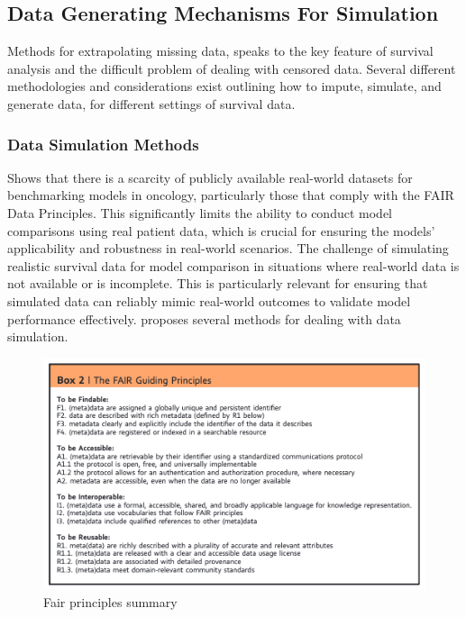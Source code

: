 \subsection{Data Generating Mechanisms For Simulation}
\noindent Methods for extrapolating missing data, speaks to the key feature of survival analysis and the difficult problem of dealing with censored data. Several different methodologies and considerations exist outlining how to impute, simulate, and generate data, for different settings of survival data.

\subsubsection{Data Simulation Methods}
\noindent \parencite{thurow_how_2023} Shows that there is a scarcity of publicly available real-world datasets for benchmarking models in oncology, particularly those that comply with the FAIR Data Principles. This significantly limits the ability to conduct model comparisons using real patient data, which is crucial for ensuring the models' applicability and robustness in real-world scenarios. The challenge of simulating realistic survival data for model comparison in situations where real-world data is not available or is incomplete. This is particularly relevant for ensuring that simulated data can reliably mimic real-world outcomes to validate model performance effectively. \parencite{thurow_how_2023} proposes several methods for dealing with data simulation.
\begin{figure}
    \includegraphics[scale=0.85]{Figures/FAIR_PRINCIPLES.png}
    \caption{\parencite{wilkinson_fair_2016} Fair principles summary}
\end{figure}

